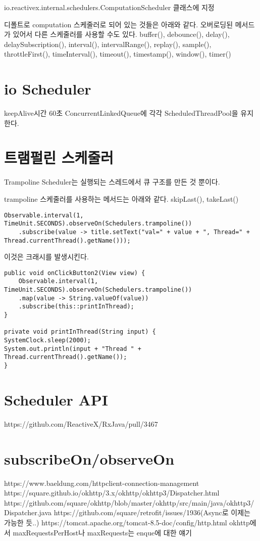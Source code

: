 \documentclass{book}
\begin{document}
{io.reactivex.internal.schedulers.ComputationScheduler 클래스에 지정

디폴트로 computation 스케줄러로 되어 있는 것들은 아래와 같다.  오버로딩된 
메서드가 있어서 다른 스케줄러를 사용할 수도 있다.
buffer(), debounce(), delay(), delaySubscription(),
interval(), intervalRange(), 
replay(), sample(), throttleFirst(), timeInterval(), timeout(), timestamp(), window(), 
timer()


\section{io Scheduler}
keepAlive시간 60초
ConcurrentLinkedQueue에 각각 ScheduledThreadPool을 유지한다.

\section{트램펄린 스케줄러}
Trampoline Scheduler는 실행되는 스레드에서 큐 구조를 만든 것 뿐이다.

trampoline 스케줄러를 사용하는 메서드는 아래와 같다.
skipLast(), takeLast()

\begin{verbatim}
Observable.interval(1, TimeUnit.SECONDS).observeOn(Schedulers.trampoline())
	.subscribe(value -> title.setText("val=" + value + ", Thread=" + 		Thread.currentThread().getName()));
\end{verbatim}

이것은 크래시를 발생시킨다.

\begin{verbatim}
public void onClickButton2(View view) {
	Observable.interval(1, TimeUnit.SECONDS).observeOn(Schedulers.trampoline())
	.map(value -> String.valueOf(value))
	.subscribe(this::printInThread);
}

private void printInThread(String input) {
SystemClock.sleep(2000);
System.out.println(input + "Thread " + Thread.currentThread().getName());
}
\end{verbatim}

\section{Scheduler API}
https://github.com/ReactiveX/RxJava/pull/3467

\section{subscribeOn/observeOn}
https://www.baeldung.com/httpclient-connection-management
https://square.github.io/okhttp/3.x/okhttp/okhttp3/Dispatcher.html
https://github.com/square/okhttp/blob/master/okhttp/src/main/java/okhttp3/Dispatcher.java
https://github.com/square/retrofit/issues/1936(Async로 이제는 가능한 듯..)
https://tomcat.apache.org/tomcat-8.5-doc/config/http.html
okhttp에서 maxRequestsPerHost나 maxRequests는 enque에 대한 얘기

}
\end{document}
